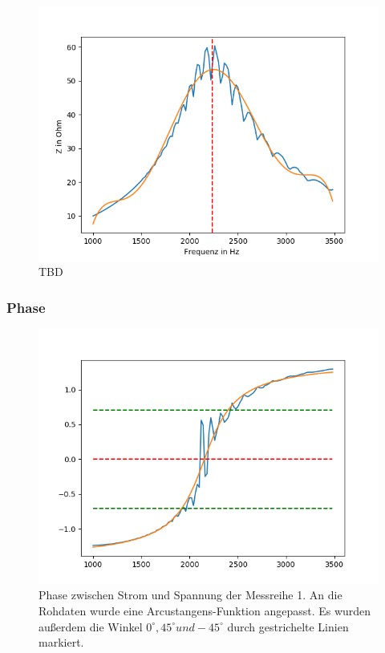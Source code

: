 \documentclass[12pt,a4paper]{article}
\begin{document}
\begin{figure}
\centering
\includegraphics[scale=1]{Bilder/Parallel_Impedanz.png}
\caption{TBD}
\label{fig:parallel_Impedanz}
\end{figure}

\subsubsection{Phase}
\begin{figure}
\includegraphics[scale=1]{Bilder/Parallel_Phase.png}
\caption{Phase zwischen Strom und Spannung der Messreihe 1. An die Rohdaten wurde eine Arcustangens-Funktion angepasst. Es wurden außerdem die Winkel $0^\circ, 45^\circ und -45^\circ$ durch gestrichelte Linien markiert.}
\label{fig:parallel_Phase}
\end{figure}
\end{document}
